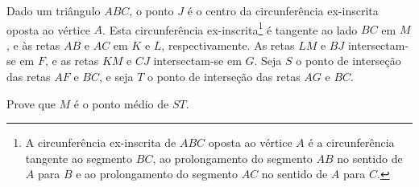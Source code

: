 Dado um triângulo $ABC$, o ponto $J$ é o centro da circunferência ex-inscrita oposta ao vértice $A$.
Esta circunferência ex-inscrita\footnote{A circunferência ex-inscrita de $ABC$ oposta ao vértice $A$ é a circunferência tangente ao segmento $BC$, ao prolongamento do segmento $AB$ no sentido de $A$ para $B$ e ao prolongamento do segmento $AC$ no sentido de $A$ para $C$.} é tangente ao lado $BC$ em $M$, e às retas $AB$ e $AC$ em $K$ e $L$, respectivamente.
As retas $LM$ e $BJ$ intersectam-se em $F$, e as retas $KM$ e $CJ$ intersectam-se em $G$.
Seja $S$ o ponto de interseção das retas $AF$ e $BC$, e seja $T$ o ponto de interseção das retas $AG$ e $BC$.

Prove que $M$ é o ponto médio de $ST$.
